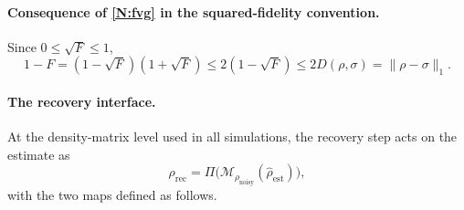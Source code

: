 \documentclass[12pt,a4paper]{article}
\newcommand{\rhon}{\rho_\mathrm{noisy}}
\newcommand{\rhor}{\rho_\mathrm{rec}}
\newcommand{\rhoe}{\hat{\rho}_\mathrm{est}}
\begin{document}
\paragraph{Consequence of \ref{N:fvg} in the squared-fidelity convention.}
Since $0 \leq \sqrt F \leq 1$,
\begin{equation}
1 - F = (1 - \sqrt F)(1 + \sqrt F) \leq 2(1 - \sqrt F) \leq 2D(\rho,\sigma) = \|\rho - \sigma\|_1 .
\label{eq:fvg_sq}
\end{equation}

\paragraph{The recovery interface.}
At the density-matrix level used in all simulations, the recovery step acts on the estimate as
\begin{equation}
\rhor = \Pi\bigl(\mathcal{M}_{\rhon}(\rhoe)\bigr),
\label{eq:recovery_structure}
\end{equation}
with the two maps defined as follows.
\end{document}
